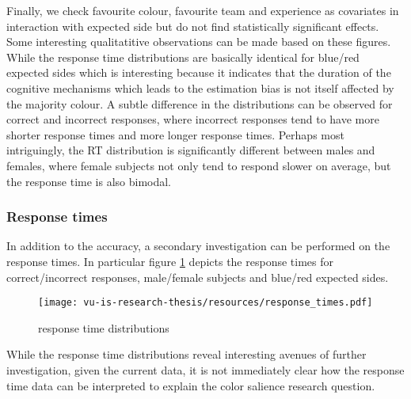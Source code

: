 Finally, we check favourite colour, favourite team and experience as covariates in interaction with expected side but do not find statistically significant effects. Some interesting qualitatitive observations can be made based on these figures. While the response time distributions are basically identical for blue/red expected sides which is interesting because it indicates that the duration of the cognitive mechanisms which leads to the estimation bias is not itself affected by the majority colour. A subtle difference in the distributions can be observed for correct and incorrect responses, where incorrect responses tend to have more shorter response times and more longer response times. Perhaps most intriguingly, the RT distribution is significantly different between males and females, where female subjects not only tend to respond slower on average, but the response time is also bimodal. 

\subsubsection{Response times}
In addition to the accuracy, a secondary investigation can be performed on the response times. In particular figure \ref{stats3} depicts the response times for correct/incorrect responses, male/female subjects and blue/red expected sides.
\begin{figure}[h!]
    \hspace{-0.5cm} %
    \texttt{[image: vu-is-research-thesis/resources/response\_times.pdf]}
   \caption{response time distributions}
   \label{stats3}
\end{figure}
While the response time distributions reveal interesting avenues of further investigation, given the current data, it is not immediately clear how the response time data can be interpreted to explain the color salience research question.